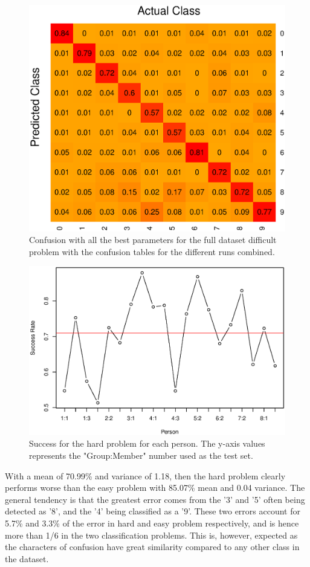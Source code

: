 \begin{figure}[H]
\centering
\includegraphics[width = 0.65 \textwidth]{graphics/knn_confusion_bestparam_hard}
\caption{Confusion with all the best parameters for the full dataset difficult problem with the confusion tables for the different runs combined.}
\label{fig:knn_conf_final_hard}
\end{figure}


\begin{figure}[H]
\centering
\includegraphics[width = 0.95 \textwidth]{graphics/knn_final_full_hard}
\caption{Success for the hard problem for each person.
The y-axis values represents the "Group:Member" number used as the test set.}
\label{fig:knn_succ_final_hard}
\end{figure}

With a mean of 70.99\% and variance of  1.18, then the hard problem clearly performs worse than the easy problem with 85.07\% mean and 0.04 variance.
The general tendency is that the greatest error comes from the '3' and '5' often being detected as '8', and the '4' being classified as a '9'.
These two errors account for 5.7\% and 3.3\% of the error in hard and easy problem respectively, and is hence more than 1/6 in the two classification problems.
This is, however, expected as the characters of confusion have great similarity compared to any other class in the dataset.

